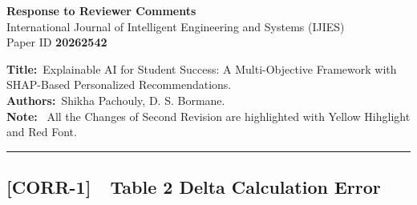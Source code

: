 \documentclass[11pt,a4paper]{article}
\newcommand{\cid}[1]{\textcolor{revred}{\textbf{[#1]}}}
\begin{document}
\begin{center}
  {\LARGE\bfseries  Response to Reviewer Comments}\\[6pt]
  {\large International Journal of Intelligent Engineering and Systems (IJIES)}\\[2pt]
  Paper ID \textbf{20262542}
\end{center}

\vspace{4pt}
\noindent\textbf{Title:}~Explainable AI for Student Success: A Multi-Objective Framework with SHAP-Based Personalized Recommendations.\\
\textbf{Authors:}~Shikha Pachouly, D. S. Bormane.\\

\textbf{Note:}~ All the Changes of Second Revision are highlighted with Yellow Hihglight and Red Font.

\vspace{6pt}
\hrule
\vspace{6pt}

%
%
%
%
%


\subsection*{\cid{CORR-1}~~Table 2 Delta Calculation Error}
\end{document}
